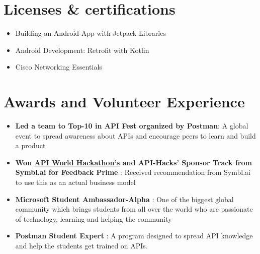 \documentclass[letterpaper,11pt]{article}
\newcommand{\resumeItem}[1]{
  \item\small{
    {#1 \vspace{-2pt}}
  }
}
\newcommand{\resumeItemListStart}{\begin{itemize}}
\newcommand{\resumeItemListEnd}{\end{itemize}\vspace{-5pt}}
\begin{document}
\section{\textbf{Licenses \& certifications}}
 \begin{itemize}[leftmargin=0.15in, label={}]
    \small{\item{
        \resumeItemListStart
                \resumeItem{{{Building an Android App with Jetpack Libraries}}}
                \resumeItem{{{Android Development: Retrofit with Kotlin}}} 
                \resumeItem{{{Cisco Networking Essentials}}}  
      \resumeItemListEnd
    }}
 \end{itemize}
    


\vspace{0.1mm}\section{\textbf{Awards and Volunteer Experience}}
 \begin{itemize}[leftmargin=0.15in, label={}]
    \small{\item{
        \resumeItemListStart
                \resumeItem{\textbf{Led a team to {Top-10 in API Fest} organized by Postman}: A global event to spread awareness about APIs and encourage peers to learn and build a product}
                \resumeItem{\textbf{{Won \href{https://devpost.com/software/feedback-prime-kbg8um}{API World Hackathon's} and {API-Hacks'} Sponsor Track from Symbl.ai for Feedback Prime} }: Received recommendation from Symbl.ai to use this as an actual business model}
                \resumeItem{\textbf{{Microsoft Student Ambassador-Alpha}} : One of the biggest global community which brings students from all over the world who are passionate of technology, learning and helping the community }
                \resumeItem{\textbf{{ Postman Student Expert}} : A program designed to spread API knowledge and help the students get trained on APIs.}
      \resumeItemListEnd
    }}
 \end{itemize}

 
 
\end{document}
